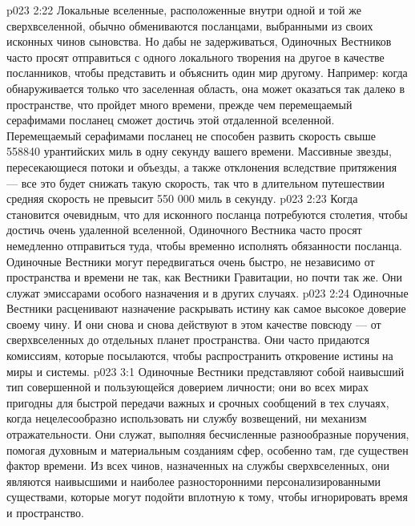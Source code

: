 \vs p023 2:22 \pc {}\bibnobreakspace {} Локальные вселенные, расположенные внутри одной и той же сверхвселенной, обычно обмениваются посланцами, выбранными из своих исконных чинов сыновства. Но дабы не задерживаться, Одиночных Вестников часто просят отправиться с одного локального творения на другое в качестве посланников, чтобы представить и объяснить один мир другому. Например: когда обнаруживается только что заселенная область, она может оказаться так далеко в пространстве, что пройдет много времени, прежде чем перемещаемый серафимами посланец сможет достичь этой отдаленной вселенной. Перемещаемый серафимами посланец не способен развить скорость свыше 558840 урантийских миль в одну секунду вашего времени. Массивные звезды, пересекающиеся потоки и объезды, а также отклонения вследствие притяжения --- все это будет снижать такую скорость, так что в длительном путешествии средняя скорость не превысит 550 000 миль в секунду.
\vs p023 2:23 Когда становится очевидным, что для исконного посланца потребуются столетия, чтобы достичь очень удаленной вселенной, Одиночного Вестника часто просят немедленно отправиться туда, чтобы временно исполнять обязанности посланца. Одиночные Вестники могут передвигаться очень быстро, не независимо от пространства и времени не так, как Вестники Гравитации, но почти так же. Они служат эмиссарами особого назначения и в других случаях.
\vs p023 2:24 \pc {}\bibnobreakspace {} Одиночные Вестники расценивают назначение раскрывать истину как самое высокое доверие своему чину. И они снова и снова действуют в этом качестве повсюду --- от сверхвселенных до отдельных планет пространства. Они часто придаются комиссиям, которые посылаются, чтобы распространить откровение истины на миры и системы.
\vs p023 3:1 Одиночные Вестники представляют собой наивысший тип совершенной и пользующейся доверием личности; они во всех мирах пригодны для быстрой передачи важных и срочных сообщений в тех случаях, когда нецелесообразно использовать ни службу возвещений, ни механизм отражательности. Они служат, выполняя бесчисленные разнообразные поручения, помогая духовным и материальным созданиям сфер, особенно там, где существен фактор времени. Из всех чинов, назначенных на службы сверхвселенных, они являются наивысшими и наиболее разносторонними персонализированными существами, которые могут подойти вплотную к тому, чтобы игнорировать время и пространство.

